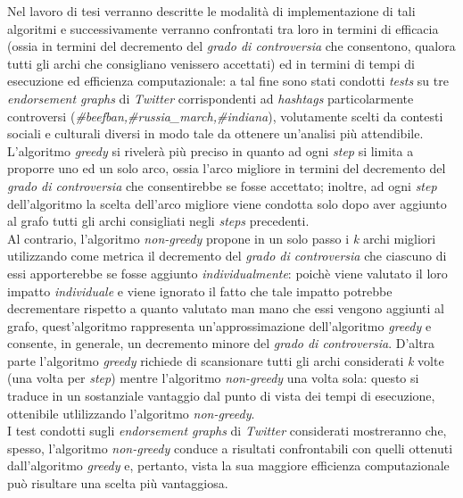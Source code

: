 \documentclass[trieste,12pt]{toptesi}
\begin{document}
Nel lavoro di tesi verranno descritte le modalità di implementazione di tali algoritmi e successivamente verranno confrontati tra loro in termini di efficacia (ossia in termini del decremento del \textit{grado di controversia} che consentono, qualora tutti gli archi che consigliano venissero accettati) ed in termini di tempi di esecuzione ed efficienza computazionale: a tal fine sono stati condotti \textit{tests} su tre \textit{endorsement graphs} di \textit{Twitter} corrispondenti ad \textit{hashtags} particolarmente controversi (\textit{\#beefban,\#russia\_march,\#indiana}), volutamente scelti da contesti sociali e culturali diversi in modo tale da ottenere un'analisi più attendibile.\\L'algoritmo \textit{greedy} si rivelerà più preciso in quanto ad ogni \textit{step} si limita a proporre uno ed un solo arco, ossia l'arco migliore in termini del decremento del \textit{grado di controversia} che consentirebbe se fosse accettato; inoltre, ad ogni \textit{step} dell'algoritmo la scelta dell'arco migliore viene condotta solo dopo aver aggiunto al grafo tutti gli archi consigliati negli \textit{steps} precedenti.\\Al contrario, l'algoritmo \textit{non-greedy} propone in un solo passo i \textit{k} archi migliori utilizzando come metrica il decremento del \textit{grado di controversia} che ciascuno di essi apporterebbe se fosse aggiunto \textit{individualmente}: poichè viene valutato il loro impatto \textit{individuale} e viene ignorato il fatto che tale impatto potrebbe decrementare rispetto a quanto valutato man mano che essi vengono aggiunti al grafo, quest'algoritmo rappresenta un'approssimazione dell'algoritmo \textit{greedy} e consente, in generale, un decremento minore del \textit{grado di controversia}. D'altra parte l'algoritmo \textit{greedy} richiede di scansionare tutti gli archi considerati \textit{k} volte (una volta per \textit{step})  mentre l'algoritmo \textit{non-greedy} una volta sola: questo si traduce in un sostanziale vantaggio dal punto di vista dei tempi di esecuzione, ottenibile utlilizzando l'algoritmo \textit{non-greedy}.\\I test condotti sugli \textit{endorsement graphs} di \textit{Twitter} considerati mostreranno che, spesso, l'algoritmo \textit{non-greedy} conduce a risultati confrontabili con quelli ottenuti dall'algoritmo \textit{greedy} e, pertanto, vista la sua maggiore efficienza computazionale può risultare una scelta più vantaggiosa.
\end{document}
